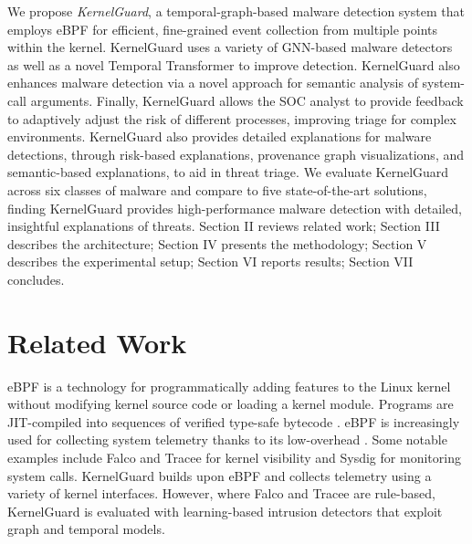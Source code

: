 \documentclass[conference]{IEEEtran}
\begin{document}
We propose \textit{KernelGuard}, a temporal-graph-based malware detection system that employs eBPF for efficient, fine-grained event collection from multiple points within the kernel. KernelGuard uses a variety of GNN-based malware detectors as well as a novel Temporal Transformer to improve detection. KernelGuard also enhances malware detection via a novel approach for semantic analysis of system-call arguments. Finally, KernelGuard allows the SOC analyst to provide feedback to adaptively adjust the risk of different processes, improving triage for complex environments. KernelGuard also provides detailed explanations for malware detections, through risk-based explanations, provenance graph visualizations, and semantic-based explanations, to aid in threat triage. We evaluate KernelGuard across six classes of malware and compare to five state-of-the-art solutions, finding KernelGuard provides high-performance malware detection with detailed, insightful explanations of threats. Section II reviews related work; Section III describes the architecture; Section IV presents the methodology; Section V describes the experimental setup; Section VI reports results; Section VII concludes.





\section{Related Work}

eBPF is a technology for programmatically adding features to the Linux kernel without modifying kernel source code or loading a kernel module. Programs are JIT-compiled into sequences of verified type-safe bytecode \cite{gregg2019bpf,hofler2021ebpf}. eBPF is increasingly used for collecting system telemetry thanks to its low-overhead \cite{vieira2020ebpfnet}. Some notable examples include Falco \cite{falco2020} and Tracee \cite{tracee2021} for kernel visibility and Sysdig \cite{sysdig2021} for monitoring system calls. KernelGuard builds upon eBPF and collects telemetry using a variety of kernel interfaces. However, where Falco and Tracee are rule-based, KernelGuard is evaluated with learning-based intrusion detectors that exploit graph and temporal models.
\end{document}
